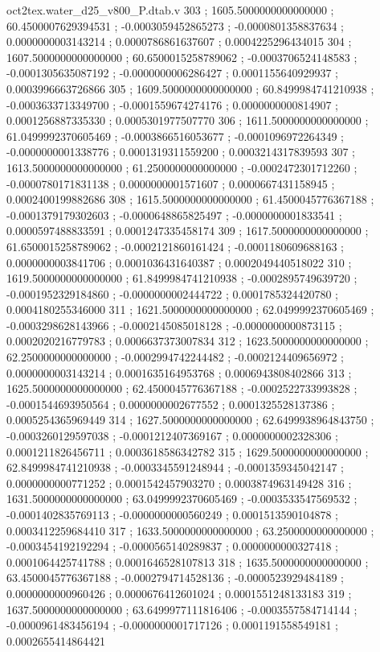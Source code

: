 \begin{filecontents}[overwrite]{oct2tex.water_d25_v800_P.dtab.v}
303 ; 1605.5000000000000000 ; 60.4500007629394531 ; -0.0003059452865273 ; -0.0000801358837634 ; 0.0000000003143214 ; 0.0000786861637607 ; 0.0004225296434015
304 ; 1607.5000000000000000 ; 60.6500015258789062 ; -0.0003706524148583 ; -0.0001305635087192 ; -0.0000000006286427 ; 0.0001155640929937 ; 0.0003996663726866
305 ; 1609.5000000000000000 ; 60.8499984741210938 ; -0.0003633713349700 ; -0.0001559674274176 ; 0.0000000000814907 ; 0.0001256887335330 ; 0.0005301977507770
306 ; 1611.5000000000000000 ; 61.0499992370605469 ; -0.0003866516053677 ; -0.0001096972264349 ; -0.0000000001338776 ; 0.0001319311559200 ; 0.0003214317839593
307 ; 1613.5000000000000000 ; 61.2500000000000000 ; -0.0002472301712260 ; -0.0000780171831138 ; 0.0000000001571607 ; 0.0000667431158945 ; 0.0002400199882686
308 ; 1615.5000000000000000 ; 61.4500045776367188 ; -0.0001379179302603 ; -0.0000648865825497 ; -0.0000000001833541 ; 0.0000597488833591 ; 0.0001247335458174
309 ; 1617.5000000000000000 ; 61.6500015258789062 ; -0.0002121860161424 ; -0.0001180609688163 ; 0.0000000003841706 ; 0.0001036431640387 ; 0.0002049440518022
310 ; 1619.5000000000000000 ; 61.8499984741210938 ; -0.0002895749639720 ; -0.0001952329184860 ; -0.0000000002444722 ; 0.0001785324420780 ; 0.0004180255346000
311 ; 1621.5000000000000000 ; 62.0499992370605469 ; -0.0003298628143966 ; -0.0002145085018128 ; -0.0000000000873115 ; 0.0002020216779783 ; 0.0006637373007834
312 ; 1623.5000000000000000 ; 62.2500000000000000 ; -0.0002994742244482 ; -0.0002124409656972 ; 0.0000000003143214 ; 0.0001635164953768 ; 0.0006943808402866
313 ; 1625.5000000000000000 ; 62.4500045776367188 ; -0.0002522733993828 ; -0.0001544693950564 ; 0.0000000002677552 ; 0.0001325528137386 ; 0.0005254365969449
314 ; 1627.5000000000000000 ; 62.6499938964843750 ; -0.0003260129597038 ; -0.0001212407369167 ; 0.0000000002328306 ; 0.0001211826456711 ; 0.0003618586342782
315 ; 1629.5000000000000000 ; 62.8499984741210938 ; -0.0003345591248944 ; -0.0001359345042147 ; 0.0000000000771252 ; 0.0001542457903270 ; 0.0003874963149428
316 ; 1631.5000000000000000 ; 63.0499992370605469 ; -0.0003533547569532 ; -0.0001402835769113 ; -0.0000000000560249 ; 0.0001513590104878 ; 0.0003412259684410
317 ; 1633.5000000000000000 ; 63.2500000000000000 ; -0.0003454192192294 ; -0.0000565140289837 ; 0.0000000000327418 ; 0.0001064425741788 ; 0.0001646528107813
318 ; 1635.5000000000000000 ; 63.4500045776367188 ; -0.0002794714528136 ; -0.0000523929484189 ; 0.0000000000960426 ; 0.0000676412601024 ; 0.0001551248133183
319 ; 1637.5000000000000000 ; 63.6499977111816406 ; -0.0003557584714144 ; -0.0000961483456194 ; -0.0000000001717126 ; 0.0001191558549181 ; 0.0002655414864421

\end{filecontents}
